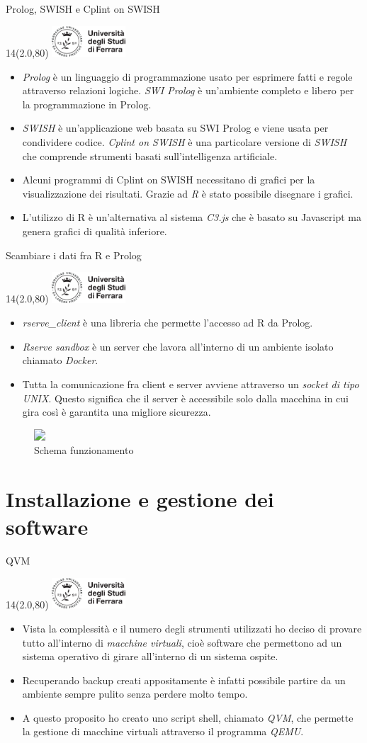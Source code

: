 \documentclass[11pt,xcolor={dvipsnames},default]{beamer} %
\newcommand{\MyLogo}{%
\begin{textblock}{14}(2.0,80)
 \includegraphics[height=1.15cm, angle=0]{logo}
\end{textblock}
}
\begin{document}
\begin{frame}{Prolog, SWISH e Cplint on SWISH}
\transboxin
\MyLogo
\begin{itemize}
\item \emph{Prolog} è un linguaggio di programmazione usato per esprimere 
fatti e regole attraverso relazioni logiche. \emph{SWI Prolog} è un'ambiente 
completo e libero per la programmazione in Prolog.
\item \emph{SWISH} è un'applicazione web basata su SWI Prolog e viene usata per 
condividere codice. \emph{Cplint on SWISH} è una particolare versione di 
\emph{SWISH} che comprende strumenti basati sull'intelligenza artificiale.
\item Alcuni programmi di Cplint on SWISH necessitano di grafici per la 
visualizzazione dei risultati. Grazie ad \emph{R} è stato possibile disegnare i 
grafici.
\item L'utilizzo di R è un'alternativa al sistema \emph{C3.js} che è basato su 
Javascript ma genera grafici di qualità inferiore.
\end{itemize}
\end{frame}

\begin{frame}{Scambiare i dati fra R e Prolog}
\transboxin
\MyLogo
\begin{itemize}
\item \emph{rserve\_client} è una libreria che permette l'accesso ad R da Prolog.
\item \emph{Rserve sandbox} è un server che lavora all'interno di un ambiente 
isolato chiamato \emph{Docker}.
\item Tutta la comunicazione fra client e server avviene attraverso un 
\emph{socket di tipo UNIX}. Questo significa che il server è accessibile solo
dalla macchina in cui gira così è garantita una migliore sicurezza.
\end{itemize}
\centering
\begin{figure}
\includegraphics<1>[width=.3\textwidth]{rserve_sandbox_scheme.png}
\caption{Schema funzionamento}
\end{figure}
\end{frame}

\section{Installazione e gestione dei software}
\begin{frame}{QVM}
\transboxin
\MyLogo
\begin{itemize}
\item Vista la complessità e il numero degli strumenti utilizzati ho deciso 
di provare tutto all'interno di \emph{macchine virtuali}, cioè software che 
permettono ad un sistema operativo di girare all'interno di un sistema ospite.
\item Recuperando backup creati appositamente è infatti possibile partire da 
un ambiente sempre pulito senza perdere molto tempo.
\item A questo proposito ho creato uno script shell, chiamato \emph{QVM}, 
che permette la gestione di macchine virtuali attraverso il programma 
\emph{QEMU}.
\end{itemize}
\end{frame}
\end{document}
